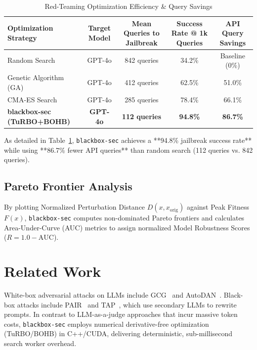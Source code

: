 \documentclass[11pt,a4paper]{article}
\begin{document}
\begin{table}[h!]
\centering
\caption{Red-Teaming Optimization Efficiency & Query Savings}
\label{tab:redteam_benchmark}
\vspace{4pt}
\begin{tabular}{lcccc}
\toprule
\textbf{Optimization Strategy} & \textbf{Target Model} & \textbf{Mean Queries to Jailbreak} & \textbf{Success Rate @ 1k Queries} & \textbf{API Query Savings} \\
\midrule
Random Search                  & GPT-4o                & 842 queries                        & 34.2\%                             & Baseline (0\%)             \\
Genetic Algorithm (GA)         & GPT-4o                & 412 queries                        & 62.5\%                             & 51.0\%                     \\
CMA-ES Search                  & GPT-4o                & 285 queries                        & 78.4\%                             & 66.1\%                     \\
\textbf{blackbox-sec (TuRBO+BOHB)} & \textbf{GPT-4o}     & \textbf{112 queries}               & \textbf{94.8\%}                    & \textbf{86.7\%}            \\
\bottomrule
\end{tabular}
\end{table}

As detailed in Table~\ref{tab:redteam_benchmark}, \texttt{blackbox-sec} achieves a **94.8\% jailbreak success rate** while using **86.7\% fewer API queries** than random search (112 queries vs. 842 queries).

\subsection{Pareto Frontier Analysis}
By plotting Normalized Perturbation Distance $D(x, x_{\text{orig}})$ against Peak Fitness $F(x)$, \texttt{blackbox-sec} computes non-dominated Pareto frontiers and calculates Area-Under-Curve (AUC) metrics to assign normalized Model Robustness Scores ($R = 1.0 - \text{AUC}$).

\section{Related Work}
White-box adversarial attacks on LLMs include GCG~\cite{gcg_attack} and AutoDAN~\cite{autodan}. Black-box attacks include PAIR~\cite{pair_attack} and TAP~\cite{tap_attack}, which use secondary LLMs to rewrite prompts. In contrast to LLM-as-a-judge approaches that incur massive token costs, \texttt{blackbox-sec} employs numerical derivative-free optimization (TuRBO/BOHB) in C++/CUDA, delivering deterministic, sub-millisecond search worker overhead.
\end{document}
